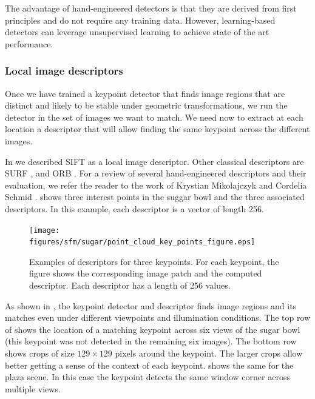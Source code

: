 The advantage of hand-engineered detectors is that they are derived from first principles and do not require any training data. However, learning-based detectors can leverage unsupervised learning to achieve state of the art performance. 




\subsubsection{Local image descriptors}

Once we have trained a keypoint detector that finds image regions that are distinct and likely to be stable under geometric transformations, we run the detector in the set of images we want to match. We need now to extract at each location a descriptor that will allow finding the same keypoint across the different images. 

In \chap{\ref{chap:stereo_vision}} we described SIFT  \cite{Lowe04} as a local image descriptor. Other classical descriptors are SURF \cite{Bay2008346}, and ORB \cite{Rublee2011}.
For a review of several hand-engineered descriptors and their evaluation, we refer the reader to the work of Krystian Mikolajczyk and Cordelia Schmid \cite{Mikolajczyk2005}.
\Fig{\ref{fig:sfm:descriptors_sugar}} shows three interest points in the suggar bowl and the three associated descriptors. In this example, each descriptor is a vector of length 256.


\begin{figure}[t]
\centerline{
\texttt{[image: figures/sfm/sugar/point\_cloud\_key\_points\_figure.eps]}
}
\caption{Examples of descriptors for three keypoints. For each keypoint, the figure shows the corresponding image patch and the computed descriptor. Each descriptor has a length of 256 values.}
\label{fig:sfm:descriptors_sugar}
\end{figure}

As shown in \fig{\ref{fig:sfm:palma_keypoint_matching_figure}}, the keypoint detector and descriptor finds image regions and its matches even under different viewpoints and illumination conditions. 
The top row of  shows the location of a matching keypoint across six views of the sugar bowl (this keypoint was not detected in the remaining six images). The bottom row shows crops of size $129 \times 129$ pixels around the keypoint. The larger crops allow better getting a sense of the context of each keypoint.
 shows the same for the plaza scene. In this case the keypoint detects the same window corner across multiple views. 


